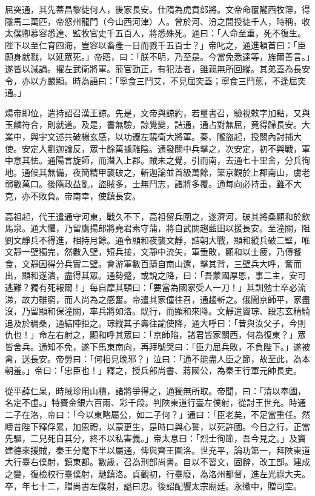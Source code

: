 
\begin{pinyinscope}

 屈突通，其先蓋昌黎徒何人，後家長安。仕隋為虎賁郎將。文帝命覆隴西牧簿，得隱馬二萬匹，帝怒州龍門（今山西河津）人。曾於河、汾之間授徒千人，時稱，收太僕卿慕容悉達、監牧官史千五百人，將悉殊死。通曰：「人命至重，死不復生。陛下以至仁育四海，豈容以畜產一日而戮千五百士？」帝叱之，通進頓首曰：「臣願身就戮，以延眾死。」帝寤，曰：「朕不明，乃至是。今當免悉達等，旌爾善言。」遂皆以減論。擢左武衛將軍。蒞官勁正，有犯法者，雖親無所回縱。其弟蓋為長安令，亦以方嚴顯。時為語曰：「寧食三鬥艾，不見屈突蓋；寧食三鬥蔥，不逢屈突通。」



 煬帝即位，遣持詔召漢王諒。先是，文帝與諒約，若璽書召，驗視敕字加點，又與玉麟符合，則就道。及是，書無驗，諒覺變，詰通，通占對無屈，竟得歸長安。大業中，與宇文述共破楊玄感，以功遷左驍衛大將軍。秦、隴盜起，授關內討捕大使。安定人劉迦論反，眾十餘萬據雕陰。通發關中兵擊之，次安定，初不與戰，軍中意其怯。通陽言旋師，而潛入上郡。賊未之覺，引而南，去通七十里舍，分兵徇地。通候其無備，夜簡精甲襲破之，斬迦論並首級萬餘，築京觀於上郡南山，虜老弱數萬口。後隋政益亂，盜賊多，士無鬥志，諸將多覆。通每向必持重，雖不大克，亦不敗負。帝南幸，使鎮長安。



 高祖起，代王遣通守河東，戰久不下，高祖留兵圍之，遂濟河，破其將桑顯和於飲馬泉。通大懼，乃留鷹揚郎將堯君素守蒲，將自武關趨藍田以援長安。至潼關，阻劉文靜兵不得進，相持月餘。通令顯和夜襲文靜，詰朝大戰，顯和縱兵破二壁，唯文靜一壁獨完，然數入壁，短兵接，文靜中流矢，軍垂敗，顯和以士疲，乃傳餐食，文靜因得分兵實二壁。會游軍數百騎自南山還，擊其背，三壁兵大呼，奮而出，顯和遂潰，盡得其眾。通勢蹙，或說之降，曰：「吾蒙國厚恩，事二主，安可逃難？獨有死報爾！」每自摩其頸曰：「要當為國家受人一刀！」其訓勉士卒必流涕，故力雖窮，而人尚為之感奮。帝遣其家僮往召，通趨斬之。俄聞京師平，家盡沒，乃留顯和保潼關，率兵將如洛。既行，而顯和來降。文靜遣竇琮、段志玄精騎追及於稠桑，通結陣拒之。琮縱其子壽往諭使降，通大呼曰：「昔與汝父子，今則仇也！」命左右射之，顯和呼其眾曰：「京師陷，諸君皆家關西，何為復東？」眾皆舍兵。通知不免，遂下馬東南向，再拜號哭曰：「臣力屈兵敗，不負陛下。」遂被禽，送長安。帝勞曰：「何相見晚邪？」泣曰：「通不能盡人臣之節，故至此，為本朝羞。」帝曰：「忠臣也！」釋之，授兵部尚書、蔣國公，為秦王行軍元帥長史。



 從平薛仁杲，時賊珍用山積，諸將爭得之，通獨無所取。帝聞，曰：「清以奉國，名定不虛。」特賚金銀六百兩、彩千段。判陜東道行臺左僕射，從討王世充。時通二子在洛，帝曰：「今以東略屬公，如二子何？」通曰：「臣老矣，不足當重任。然疇昔陛下釋俘累，加恩禮，以蒙更生，是時口與心誓，以死許國。今日之行，正當先驅，二兒死自其分，終不以私害義。」帝太息曰：「烈士徇節，吾今見之。」及竇建德來援賊，秦王分麾下半以屬通，俾與齊王圍洛。世充平，論功第一，拜陜東道大行臺右僕射，鎮東都。數歲，召為刑部尚書。自以不習文，固辭，改工部。建成之變，復檢校行臺僕射，馳鎮洛。貞觀初，行臺廢，為洛州都督，進左光祿大夫。卒，年七十二，贈尚書左僕射，謚曰忠。後詔配饗太宗廟廷。永徽中，贈司空。




\end{pinyinscope}
